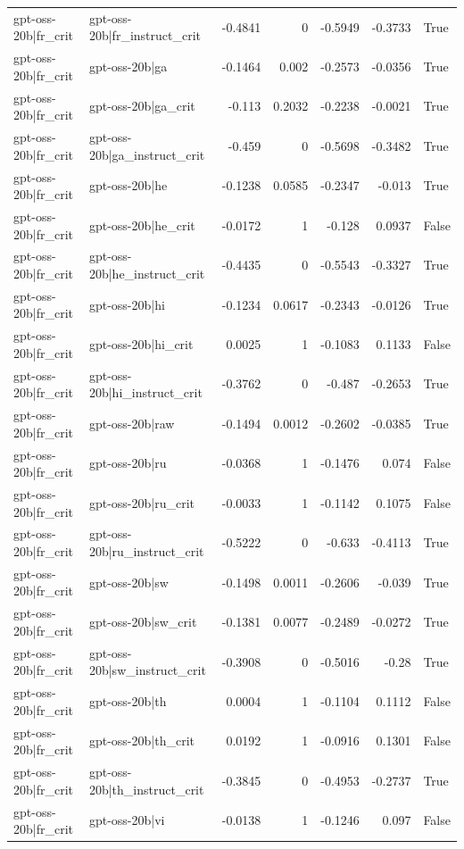 \begin{table}
\begin{tabular}{l l r r r r l}
gpt-oss-20b|fr_crit & gpt-oss-20b|fr_instruct_crit & -0.4841 & 0 & -0.5949 & -0.3733 & True \\
gpt-oss-20b|fr_crit & gpt-oss-20b|ga & -0.1464 & 0.002 & -0.2573 & -0.0356 & True \\
gpt-oss-20b|fr_crit & gpt-oss-20b|ga_crit & -0.113 & 0.2032 & -0.2238 & -0.0021 & True \\
gpt-oss-20b|fr_crit & gpt-oss-20b|ga_instruct_crit & -0.459 & 0 & -0.5698 & -0.3482 & True \\
gpt-oss-20b|fr_crit & gpt-oss-20b|he & -0.1238 & 0.0585 & -0.2347 & -0.013 & True \\
gpt-oss-20b|fr_crit & gpt-oss-20b|he_crit & -0.0172 & 1 & -0.128 & 0.0937 & False \\
gpt-oss-20b|fr_crit & gpt-oss-20b|he_instruct_crit & -0.4435 & 0 & -0.5543 & -0.3327 & True \\
gpt-oss-20b|fr_crit & gpt-oss-20b|hi & -0.1234 & 0.0617 & -0.2343 & -0.0126 & True \\
gpt-oss-20b|fr_crit & gpt-oss-20b|hi_crit & 0.0025 & 1 & -0.1083 & 0.1133 & False \\
gpt-oss-20b|fr_crit & gpt-oss-20b|hi_instruct_crit & -0.3762 & 0 & -0.487 & -0.2653 & True \\
gpt-oss-20b|fr_crit & gpt-oss-20b|raw & -0.1494 & 0.0012 & -0.2602 & -0.0385 & True \\
gpt-oss-20b|fr_crit & gpt-oss-20b|ru & -0.0368 & 1 & -0.1476 & 0.074 & False \\
gpt-oss-20b|fr_crit & gpt-oss-20b|ru_crit & -0.0033 & 1 & -0.1142 & 0.1075 & False \\
gpt-oss-20b|fr_crit & gpt-oss-20b|ru_instruct_crit & -0.5222 & 0 & -0.633 & -0.4113 & True \\
gpt-oss-20b|fr_crit & gpt-oss-20b|sw & -0.1498 & 0.0011 & -0.2606 & -0.039 & True \\
gpt-oss-20b|fr_crit & gpt-oss-20b|sw_crit & -0.1381 & 0.0077 & -0.2489 & -0.0272 & True \\
gpt-oss-20b|fr_crit & gpt-oss-20b|sw_instruct_crit & -0.3908 & 0 & -0.5016 & -0.28 & True \\
gpt-oss-20b|fr_crit & gpt-oss-20b|th & 0.0004 & 1 & -0.1104 & 0.1112 & False \\
gpt-oss-20b|fr_crit & gpt-oss-20b|th_crit & 0.0192 & 1 & -0.0916 & 0.1301 & False \\
gpt-oss-20b|fr_crit & gpt-oss-20b|th_instruct_crit & -0.3845 & 0 & -0.4953 & -0.2737 & True \\
gpt-oss-20b|fr_crit & gpt-oss-20b|vi & -0.0138 & 1 & -0.1246 & 0.097 & False \\

\end{tabular}
\end{table}
